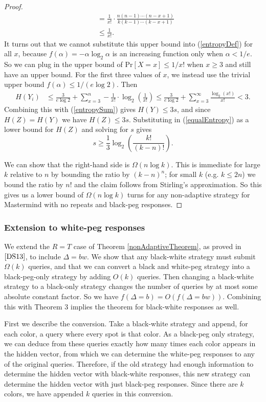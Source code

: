 \documentclass[12pt, a4paper]{article}
\begin{document}
\begin{proof}
\begin{align*}
		&= \frac{1}{x!}\cdot\frac{n(n-1)\cdots(n-x+1)}{k(k-1)\cdots(k-x+1)}\\
		&\leq \frac{1}{x!}.
	\end{align*}
	It turns out that we cannot substitute this upper bound into  (\ref{entropyDef}) for all $x$, because $f(\alpha)=-\alpha\log_2\alpha$ is an increasing function only when $\alpha<1/e$. So we can plug in the upper bound of $\text{Pr}[X=x]\le 1/x!$ when $x\ge 3$ and still have an upper bound. For the first three values of $x$, we instead use the trivial upper bound $f(\alpha)\le 1/(e\log 2)$. Then
	\begin{align*}
		H(Y_i) &\leq \frac{3}{e\log 2}+\sum_{x=3}^n-\frac{1}{x!}\cdot\log_2\left(\frac{1}{x!}\right)
		\le \frac{3}{e\log 2}+\sum_{x=3}^\infty \frac{\log_2(x!)}{x!}
		<3.
	\end{align*}
	Combining this with (\ref{entropySum}) gives $H(Y) \leq 3s$, and since $H(Z) = H(Y)$ we have $H(Z) \leq 3s$. Substituting in (\ref{equalEntropy}) as a lower bound for $H(Z)$ and solving for $s$ gives
	\begin{equation*}
	s \geq \frac{1}{3}\log_2\left(\frac{k!}{(k-n)!}\right).
	\end{equation*}
	
	We can show that the right-hand side is $\Omega(n\log k)$. This is immediate for large $k$ relative to $n$ by bounding the ratio by $(k-n)^n$; for small $k$ (e.g. $k \leq 2n$) we bound the ratio by $n!$ and the claim follows from Stirling's approximation. So this gives us a lower bound of $\Omega(n \log k)$ turns for any non-adaptive strategy for Mastermind with no repeats and black-peg responses.
\end{proof}
\subsubsection{Extension to white-peg responses}
We extend the $R=T$ case of Theorem \ref{nonAdaptiveTheorem}, as proved in $\cite{DS13}$, to include $\Delta = bw$. We show that any black-white strategy must submit $\Omega(k)$ queries, and that we can convert a black and white-peg strategy into a black-peg-only strategy by adding $O(k)$ queries. 
Then changing a black-white strategy to a black-only strategy changes the number of queries by at most some absolute constant factor. So we have $f(\Delta = b) = O(f(\Delta = bw))$. Combining this with Theorem 3 implies the theorem for black-white responses as well.

First we describe the conversion. Take a black-white strategy and append, for each color, a query where every spot is that color. As a black-peg only strategy, we can deduce from these queries exactly how many times each color appears in the hidden vector, from which we can determine the white-peg responses to any of the original queries. Therefore, if the old strategy had enough information to determine the hidden vector with black-white responses, this new strategy can determine the hidden vector with just black-peg responses. Since there are $k$ colors, we have appended $k$ queries in this conversion. 
\end{document}
